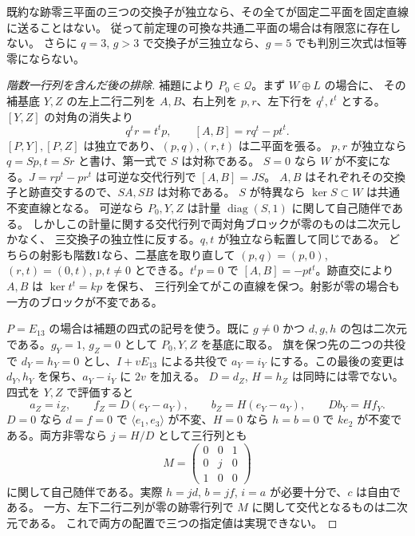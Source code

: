 \begin{theorem}\label{thm:no-three-bracket-compression}
既約な跡零三平面の三つの交換子が独立なら、その全てが固定二平面を固定直線に送ることはない。
従って前定理の可換な共通二平面の場合は有限窓に存在しない。
さらに $q=3$, $g>3$ で交換子が三独立なら、$g=5$ でも判別三次式は恒等零にならない。
\end{theorem}
\begin{proof}[階数一行列を含んだ後の排除]
補題により $P_0\in\mathcal Q$。まず $W\oplus L$ の場合に、
その補基底 $Y,Z$ の左上二行二列を $A,B$、右上列を $p,r$、左下行を $q^t,t^t$ とする。
$[Y,Z]$ の対角の消失より
\[
               q^t r=t^t p,\qquad [A,B]=r q^t-p t^t .
\]
$[P,Y],[P,Z]$ は独立であり、$(p,q),(r,t)$ は二平面を張る。
$p,r$ が独立なら $q=Sp,t=Sr$ と書け、第一式で $S$ は対称である。
$S=0$ なら $W$ が不変になる。$J=r p^t-p r^t$ は可逆な交代行列で $[A,B]=JS$。
$A,B$ はそれぞれその交換子と跡直交するので、$SA,SB$ は対称である。
$S$ が特異なら $\ker S\subset W$ は共通不変直線となる。
可逆なら $P_0,Y,Z$ は計量 $\operatorname{diag}(S,1)$ に関して自己随伴である。
しかしこの計量に関する交代行列で両対角ブロックが零のものは二次元しかなく、
三交換子の独立性に反する。$q,t$ が独立なら転置して同じである。
どちらの射影も階数1なら、二基底を取り直して
$(p,q)=(p,0)$, $(r,t)=(0,t)$, $p,t\ne0$ とできる。$t^tp=0$ で
$[A,B]=-pt^t$。跡直交により $A,B$ は $\ker t^t=kp$ を保ち、
三行列全てがこの直線を保つ。射影が零の場合も一方のブロックが不変である。

$P=E_{13}$ の場合は補題の四式の記号を使う。既に $g\ne0$ かつ
$d,g,h$ の包は二次元である。$g_Y=1$, $g_Z=0$ として $P_0,Y,Z$ を基底に取る。
旗を保つ先の二つの共役で $d_Y=h_Y=0$ とし、$I+vE_{13}$ による共役で
$a_Y=i_Y$ にする。この最後の変更は $d_Y,h_Y$ を保ち、$a_Y-i_Y$ に $2v$ を加える。
$D=d_Z$, $H=h_Z$ は同時には零でない。四式を $Y,Z$ で評価すると
\[
 a_Z=i_Z,\qquad f_Z=D(e_Y-a_Y),\qquad b_Z=H(e_Y-a_Y),
 \qquad D b_Y=H f_Y .
\]
$D=0$ なら $d=f=0$ で $\langle e_1,e_3\rangle$ が不変、$H=0$ なら $h=b=0$ で
$ke_2$ が不変である。両方非零なら $j=H/D$ として三行列とも
\[
                  M=\begin{pmatrix}0&0&1\\0&j&0\\1&0&0\end{pmatrix}
\]
に関して自己随伴である。実際 $h=jd$, $b=jf$, $i=a$ が必要十分で、$c$ は自由である。
一方、左下二行二列が零の跡零行列で $M$ に関して交代となるものは二次元である。
これで両方の配置で三つの指定値は実現できない。
\end{proof}

